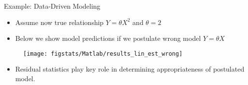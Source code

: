 \documentclass[9pt]{beamer}
\begin{document}
%
\begin{frame}{Example: Data-Driven Modeling}

\begin{block}{}
\begin{itemize}
\item Assume now true relationship $Y=\theta X^2$ and $\theta=2$
\item Below we show model predictions if we postulate wrong model $Y=\theta X$
\end{itemize}
\end{block}

\begin{figure}[!htb]
    \centering
	\texttt{[image: figstats/Matlab/results\_lin\_est\_wrong]}
\end{figure}

\begin{itemize}
\item Residual statistics play key role in determining appropriateness of postulated model.
\end{itemize}

\end{frame}
\end{document}
